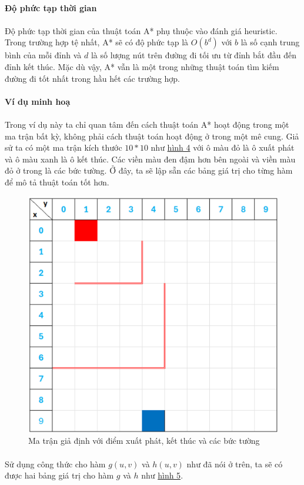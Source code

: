 \paragraph{Độ phức tạp thời gian}
\paragraph{}{Độ phức tạp thời gian của thuật toán A* phụ thuộc vào đánh giá heuristic. Trong trường hợp tệ nhất, A* sẽ có độ phức tạp là $O(b^d)$ với $b$ là số cạnh trung bình của mỗi đỉnh và $d$ là số lượng nút trên đường đi tối ưu từ đỉnh bắt đầu đến đỉnh kết thúc. Mặc dù vậy, A* vẫn là một trong những thuật toán tìm kiếm đường đi tốt nhất trong hầu hết các trường hợp.}

\paragraph{Ví dụ minh hoạ}
\paragraph{}{Trong ví dụ này ta chỉ quan tâm đến cách thuật toán A* hoạt động trong một ma trận bất kỳ, không phải cách thuật toán hoạt động ở trong một mê cung. Giả sử ta có một ma trận kích thước $10 * 10$ như \hyperref[fig:astar_pic1]{hình 4} với ô màu đỏ là ô xuất phát và ô màu xanh là ô kết thúc. Các viền màu đen đậm hơn bên ngoài và viền màu đỏ ở trong là các bức tường. Ở đây, ta sẽ lập sẵn các bảng giá trị cho từng hàm để mô tả thuật toán tốt hơn.}

\begin{figure}[H]
    \centering
    \includegraphics[width=0.5\linewidth]{img/astar_pic1.png}
    \caption{Ma trận giả định với điểm xuất phát, kết thúc và các bức tường}
    \label{fig:astar_pic1}
\end{figure}

\paragraph{}{Sử dụng công thức cho hàm $g(u, v)$ và $h(u, v)$ như đã nói ở trên, ta sẽ có được hai bảng giá trị cho hàm $g$ và $h$ như \hyperref[fig:astar_pic2]{hình 5}.}

